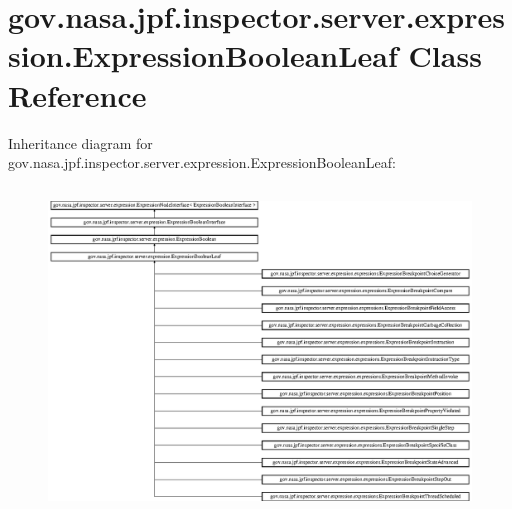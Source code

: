 \hypertarget{classgov_1_1nasa_1_1jpf_1_1inspector_1_1server_1_1expression_1_1_expression_boolean_leaf}{}\section{gov.\+nasa.\+jpf.\+inspector.\+server.\+expression.\+Expression\+Boolean\+Leaf Class Reference}
\label{classgov_1_1nasa_1_1jpf_1_1inspector_1_1server_1_1expression_1_1_expression_boolean_leaf}
Inheritance diagram for gov.\+nasa.\+jpf.\+inspector.\+server.\+expression.\+Expression\+Boolean\+Leaf\+:\begin{figure}[H]
\begin{center}
\leavevmode
\includegraphics[height=8.689655cm]{classgov_1_1nasa_1_1jpf_1_1inspector_1_1server_1_1expression_1_1_expression_boolean_leaf}
\end{center}
\end{figure}
